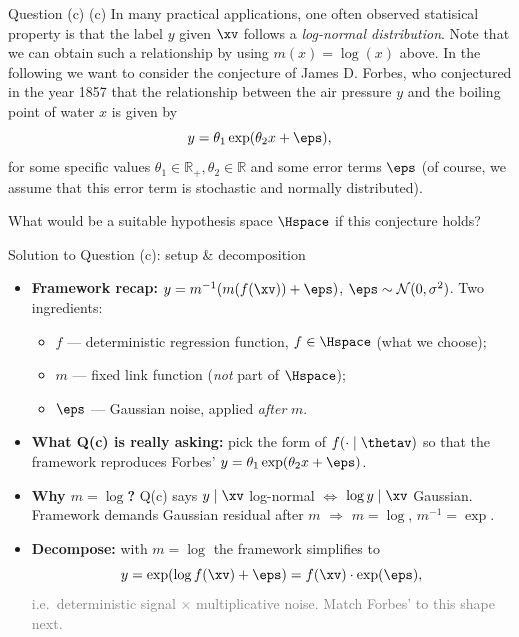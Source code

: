 \documentclass[aspectratio=169]{beamer}
\begin{document}
\begin{frame}{Question (c)}
	(c) In many practical applications, one often observed statisical property is that the label $y$ given $\xv$ follows a \emph{log-normal distribution}. Note that we can obtain such a relationship by using $m(x) = \log(x)$ above. In the following we want to consider the conjecture of James D. Forbes, who conjectured in the year 1857 that the relationship between the air pressure $y$ and the boiling point of water $x$ is given by $$y = \theta_1 \exp(\theta_2 x + \eps),$$ for some specific values $\theta_1 \in \mathbb{R}_+, \theta_2 \in \mathbb{R}$ and some error terms $\eps$ (of course, we assume that this error term is stochastic and normally distributed).
	
	What would be a suitable hypothesis space $\Hspace$ if this conjecture holds?
\end{frame}

\begin{frame}{Solution to Question (c): setup \& decomposition}
	\small
	\begin{itemize}\setlength{\itemsep}{5pt}
		\item<1-> \textbf{Framework recap:}\; $y = m^{-1}(m(f(\xv)) + \eps)$,\; $\eps \sim \mathcal{N}(0, \sigma^2)$.\;
			Two ingredients:
			\begin{itemize}\setlength{\itemsep}{0pt}
				\item[$\circ$] $f$ --- deterministic regression function,\; $f \in \Hspace$ (what we choose);
				\item[$\circ$] $m$ --- fixed link function (\emph{not} part of $\Hspace$);
				\item[$\circ$] $\eps$ --- Gaussian noise, applied \emph{after} $m$.
			\end{itemize}
		\item<2-> \textbf{What Q(c) is really asking:}\; pick the form of $f(\cdot \mid \thetav)$ so that the framework reproduces Forbes' $y = \theta_1 \exp(\theta_2 x + \eps)$.
		\item<3-> \textbf{Why $m = \log$?}\; Q(c) says $y \mid \xv$ log-normal $\Longleftrightarrow$ $\log y \mid \xv$ Gaussian.\;
			Framework demands Gaussian residual after $m$\; $\Longrightarrow$\; $m = \log$,\; $m^{-1} = \exp$.
		\item<4-> \textbf{Decompose:}\; with $m = \log$ the framework simplifies to
			\[
				y = \exp(\log f(\xv) + \eps) = f(\xv) \cdot \exp(\eps),
			\]
			\textcolor{gray}{\footnotesize i.e.\ deterministic signal $\times$ multiplicative noise. Match Forbes' to this shape next.}
	\end{itemize}
\end{frame}
\end{document}
